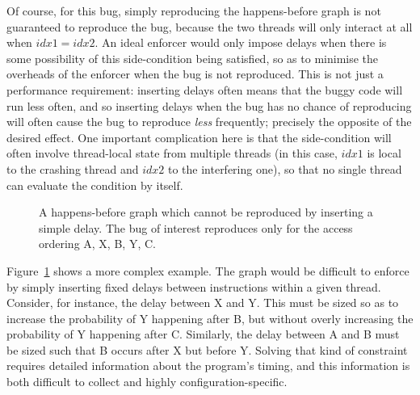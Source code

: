 Of course, for this bug, simply reproducing the happens-before graph
is not guaranteed to reproduce the bug, because the two threads will
only interact at all when $\mathit{idx1} = \mathit{idx2}$.  An ideal
enforcer would only impose delays when there is some possibility of
this side-condition being satisfied, so as to minimise the overheads
of the enforcer when the bug is not reproduced.  This is not just a
performance requirement: inserting delays often means that the buggy
code will run less often, and so inserting delays when the bug has no
chance of reproducing will often cause the bug to reproduce
\emph{less} frequently; precisely the opposite of the desired effect.
One important complication here is that the side-condition will often
involve thread-local state from multiple threads (in this case,
$\mathit{idx1}$ is local to the crashing thread and $\mathit{idx2}$ to
the interfering one), so that no single thread can evaluate the
condition by itself.  

\begin{figure}
  \begin{centering}
    \hfill
  \hfill
  \end{centering}
  \caption{A happens-before graph which cannot be reproduced by
    inserting a simple delay.  The bug of interest reproduces only for
    the access ordering A, X, B, Y, C.}
  \label{fig:enforce_crash:complex_hb}
\end{figure}

Figure~\ref{fig:enforce_crash:complex_hb} shows a more complex
example.  The graph would be difficult to enforce by simply inserting
fixed delays between instructions within a given thread.  Consider,
for instance, the delay between X and Y.  This must be sized so as to
increase the probability of Y happening after B, but without overly
increasing the probability of Y happening after C.  Similarly, the
delay between A and B must be sized such that B occurs after X but
before Y.  Solving that kind of constraint requires detailed
information about the program's timing, and this information is both
difficult to collect and highly configuration-specific.

